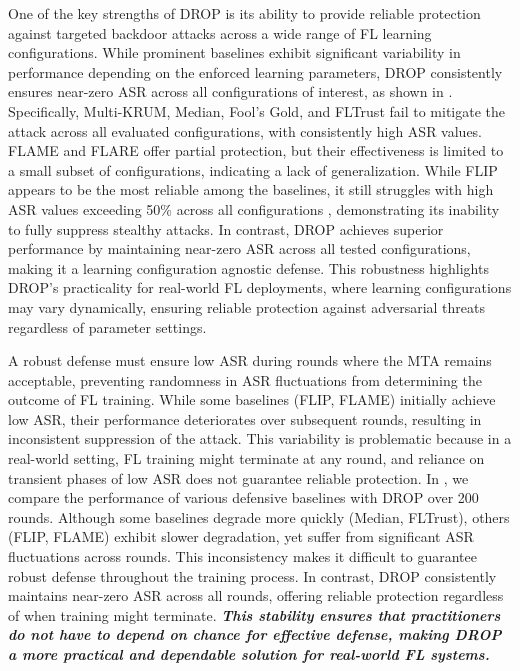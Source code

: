  One of the key strengths of DROP is its ability to provide reliable protection against targeted backdoor attacks across a wide range of FL learning configurations. While prominent baselines exhibit significant variability in performance depending on the enforced learning parameters, DROP consistently ensures near-zero ASR across all configurations of interest, as shown in . Specifically, Multi-KRUM, Median, Fool’s Gold, and FLTrust fail to mitigate the attack across all evaluated configurations, with consistently high ASR values. FLAME and FLARE offer partial protection, but their effectiveness is limited to a small subset of configurations, indicating a lack of generalization. While FLIP appears to be the most reliable among the baselines, it still struggles with high ASR values exceeding 50\% across all configurations , demonstrating its inability to fully suppress stealthy attacks. In contrast, DROP achieves superior performance by maintaining near-zero ASR across all tested configurations, making it a learning configuration agnostic defense. This robustness highlights DROP’s practicality for real-world FL deployments, where learning configurations may vary dynamically, ensuring reliable protection against adversarial threats regardless of parameter settings.

 A robust defense must ensure low ASR during rounds where the MTA remains acceptable, preventing randomness in ASR fluctuations from determining the outcome of FL training. While some baselines (\eg FLIP, FLAME) initially achieve low ASR, their performance deteriorates over subsequent rounds, resulting in inconsistent suppression of the attack. This variability is problematic because in a real-world setting, FL training might terminate at any round, and reliance on transient phases of low ASR does not guarantee reliable protection. In , we compare the performance of various defensive baselines with DROP over 200 rounds. Although some baselines degrade more quickly (\eg Median, FLTrust), others (\eg FLIP, FLAME) exhibit slower degradation, yet suffer from significant ASR fluctuations across rounds. This inconsistency makes it difficult to guarantee robust defense throughout the training process. In contrast, DROP consistently maintains near-zero ASR across all rounds, offering reliable protection regardless of when training might terminate. \textbf{\textit{This stability ensures that practitioners do not have to depend on chance for effective defense, making DROP a more practical and dependable solution for real-world FL systems.}} 


